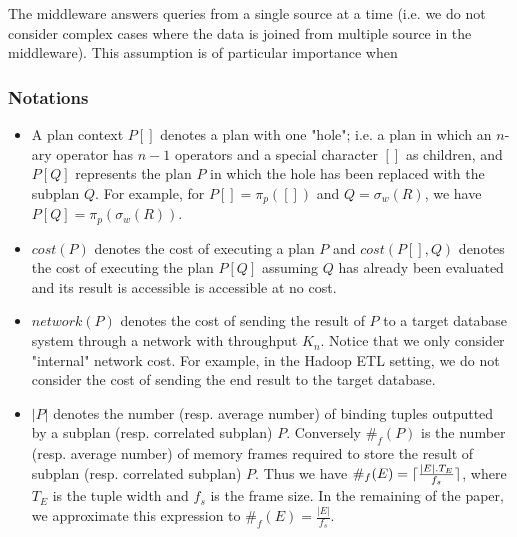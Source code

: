The middleware answers queries from a single source at a time (i.e. we do not consider complex cases where the data is joined from multiple source in the middleware). This assumption is of particular importance when 


\subsubsection{Notations}

\begin{itemize}
\item A plan context $P[]$ denotes a plan with one "hole"; i.e. a plan in which an $n$-ary operator has $n-1$ operators and a special character $[]$ as children, and $P[Q]$ represents the plan $P$ in which the hole has been replaced with the subplan $Q$. For example, for $P[] = \pi_p([])$ and $Q = \sigma_w(R)$, we have $P[Q] = \pi_p(\sigma_w(R))$.
\item $cost(P)$ denotes the cost of executing a plan $P$ and $cost(P[],Q)$ denotes the cost of executing the plan $P[Q]$ assuming $Q$ has already been evaluated and its result is accessible is accessible at no cost.
\item $network(P)$ denotes the cost of sending the result of $P$ to a target database system through a network with throughput $K_n$. Notice that we only consider "internal" network cost. For example, in the Hadoop ETL setting, we do not consider the cost of sending the end result to the target database. 
\item $|P|$ denotes the number (resp. average number) of binding tuples outputted by a subplan (resp. correlated subplan) $P$. Conversely $\#_f(P)$ is the number (resp. average number) of memory frames required to store the result of subplan (resp. correlated subplan) $P$. Thus we have $\#_f (E) = \lceil\frac{|E|.T_E}{f_s}\rceil$, where $T_E$ is the tuple width and $f_s$ is the frame size. In the remaining of the paper, we approximate this expression to $\#_f(E) = \frac{|E|}{f_s}$. 

\end{itemize}

